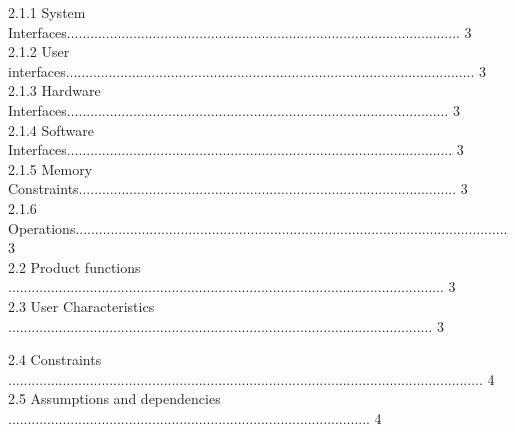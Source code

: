 \documentclass[10pt,draftclsnofoot,onecolumn]{IEEEtran}
\newcommand\tab[1][1cm]{\hspace*{#1}}
\begin{document}
\tab\tab 2.1.1 System Interfaces..................................................................................................... 3\\
                 \vspace{5mm}
\tab\tab 2.1.2 User interfaces......................................................................................................... 3\\
                 \vspace{5mm}
\tab\tab 2.1.3 Hardware Interfaces.................................................................................................. 3\\
                 \vspace{5mm}
\tab\tab 2.1.4 Software Interfaces................................................................................................... 3\\
                 \vspace{5mm}
\tab\tab 2.1.5 Memory Constraints................................................................................................. 3\\
                 \vspace{5mm}
\tab\tab 2.1.6 Operations............................................................................................................... 3\\
                 \vspace{5mm}
\tab 2.2 Product functions ................................................................................................................ 3\\
                 \vspace{5mm}
\tab 2.3 User Characteristics ............................................................................................................. 3\\
                 \vspace{5mm}
                 
\tab 2.4 Constraints .......................................................................................................................... 4\\
                 \vspace{5mm}
\tab 2.5 Assumptions and dependencies ............................................................................................. 4\\
                 \vspace{5mm}
                 
\end{document}
